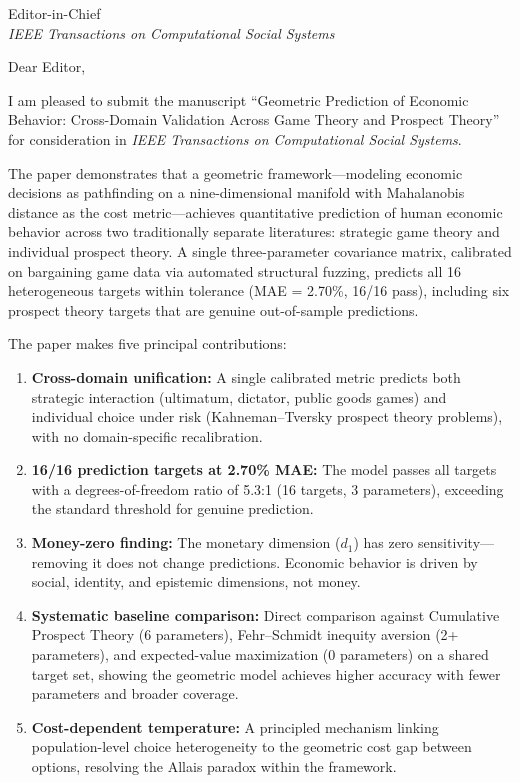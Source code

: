\documentclass[12pt]{letter}
\begin{document}
\begin{letter}{%
Editor-in-Chief\\
\emph{IEEE Transactions on Computational Social Systems}}

\opening{Dear Editor,}

I am pleased to submit the manuscript ``Geometric Prediction of Economic Behavior: Cross-Domain Validation Across Game Theory and Prospect Theory'' for consideration in \emph{IEEE Transactions on Computational Social Systems}.

The paper demonstrates that a geometric framework---modeling economic decisions as pathfinding on a nine-dimensional manifold with Mahalanobis distance as the cost metric---achieves quantitative prediction of human economic behavior across two traditionally separate literatures: strategic game theory and individual prospect theory.  A single three-parameter covariance matrix, calibrated on bargaining game data via automated structural fuzzing, predicts all 16 heterogeneous targets within tolerance (MAE = 2.70\%, 16/16 pass), including six prospect theory targets that are genuine out-of-sample predictions.

The paper makes five principal contributions:
\begin{enumerate}
    \item \textbf{Cross-domain unification:} A single calibrated metric predicts both strategic interaction (ultimatum, dictator, public goods games) and individual choice under risk (Kahneman--Tversky prospect theory problems), with no domain-specific recalibration.
    \item \textbf{16/16 prediction targets at 2.70\% MAE:} The model passes all targets with a degrees-of-freedom ratio of 5.3:1 (16 targets, 3 parameters), exceeding the standard threshold for genuine prediction.
    \item \textbf{Money-zero finding:} The monetary dimension ($d_1$) has zero sensitivity---removing it does not change predictions.  Economic behavior is driven by social, identity, and epistemic dimensions, not money.
    \item \textbf{Systematic baseline comparison:} Direct comparison against Cumulative Prospect Theory (6 parameters), Fehr--Schmidt inequity aversion (2+ parameters), and expected-value maximization (0 parameters) on a shared target set, showing the geometric model achieves higher accuracy with fewer parameters and broader coverage.
    \item \textbf{Cost-dependent temperature:} A principled mechanism linking population-level choice heterogeneity to the geometric cost gap between options, resolving the Allais paradox within the framework.
\end{enumerate}


\end{letter}
\end{document}
